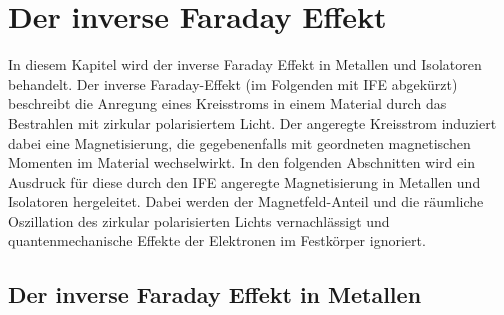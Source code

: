 \chapter{Der inverse Faraday Effekt}
\label{ch:ife}

In diesem Kapitel wird der inverse Faraday Effekt in Metallen und Isolatoren behandelt.
Der inverse Faraday-Effekt (im Folgenden mit IFE abgekürzt) beschreibt die Anregung eines Kreisstroms in einem Material durch das Bestrahlen mit zirkular polarisiertem Licht.
Der angeregte Kreisstrom induziert dabei eine Magnetisierung, die gegebenenfalls mit geordneten magnetischen Momenten im Material wechselwirkt.
In den folgenden Abschnitten wird ein Ausdruck für diese durch den IFE angeregte Magnetisierung in Metallen und Isolatoren hergeleitet.
Dabei werden der Magnetfeld-Anteil und die räumliche Oszillation des zirkular polarisierten Lichts vernachlässigt und
quantenmechanische Effekte der Elektronen im Festkörper ignoriert. \cite{hertel} \cite{jäckl}

\section{Der inverse Faraday Effekt in Metallen}

